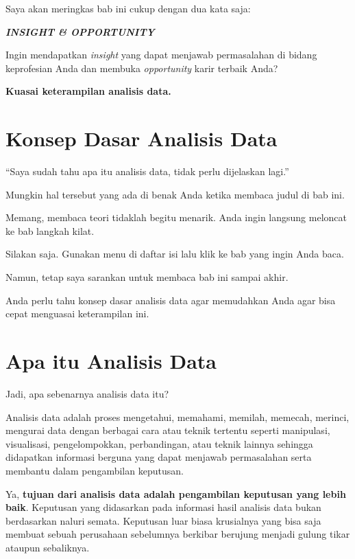 \documentclass[openany]{book}
\begin{document}
Saya akan meringkas bab ini cukup dengan dua kata saja:

\emph{\textbf{INSIGHT \& OPPORTUNITY}}

Ingin mendapatkan \emph{insight} yang dapat menjawab permasalahan di
bidang keprofesian Anda dan membuka \emph{opportunity} karir terbaik
Anda?

\textbf{Kuasai keterampilan analisis data.}

\section*{Konsep Dasar Analisis Data}\label{konsep-dasar-analisis-data}

``Saya sudah tahu apa itu analisis data, tidak perlu dijelaskan lagi.''

Mungkin hal tersebut yang ada di benak Anda ketika membaca judul di bab
ini.

Memang, membaca teori tidaklah begitu menarik. Anda ingin langsung
meloncat ke bab langkah kilat.

Silakan saja. Gunakan menu di daftar isi lalu klik ke bab yang ingin
Anda baca.

Namun, tetap saya sarankan untuk membaca bab ini sampai akhir.

Anda perlu tahu konsep dasar analisis data agar memudahkan Anda agar
bisa cepat menguasai keterampilan ini.

\section*{Apa itu Analisis Data}\label{apa-itu-analisis-data}

Jadi, apa sebenarnya analisis data itu?

Analisis data adalah proses mengetahui, memahami, memilah, memecah,
merinci, mengurai data dengan berbagai cara atau teknik tertentu seperti
manipulasi, visualisasi, pengelompokkan, perbandingan, atau teknik
lainnya sehingga didapatkan informasi berguna yang dapat menjawab
permasalahan serta membantu dalam pengambilan keputusan.

Ya, \textbf{tujuan dari analisis data adalah pengambilan keputusan yang
lebih baik}. Keputusan yang didasarkan pada informasi hasil analisis
data bukan berdasarkan naluri semata. Keputusan luar biasa krusialnya
yang bisa saja membuat sebuah perusahaan sebelumnya berkibar berujung
menjadi gulung tikar ataupun sebaliknya.
\end{document}
